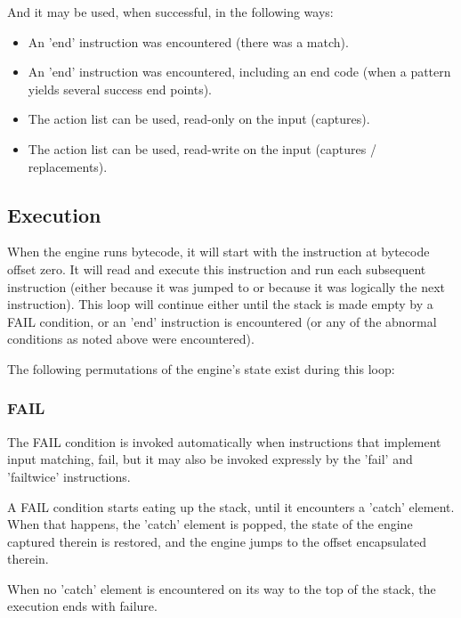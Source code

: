 And it may be used, when successful, in the following ways:

\begin{itemize}

\item An 'end' instruction was encountered (there was a match).

\item An 'end' instruction was encountered, including an end code
(when a pattern yields several success end points).

\item The action list can be used, read-only on the input (captures).

\item The action list can be used, read-write on the input
(captures / replacements).

\end{itemize}

\subsection{Execution}

When the engine runs bytecode, it will start with the instruction
at bytecode offset zero. It will read and execute this instruction
and run each subsequent instruction (either because it was jumped to
or because it was logically the next instruction).
This loop will continue either until the stack is made empty by a FAIL
condition, or an 'end' instruction is encountered
(or any of the abnormal conditions as noted above were encountered).

The following permutations of the engine's state exist during this loop:

\subsubsection{FAIL}

The FAIL condition is invoked automatically when instructions
that implement input matching, fail, but it may also be invoked
expressly by the 'fail' and 'failtwice' instructions.

A FAIL condition starts eating up the stack, until it encounters
a 'catch' element. When that happens, the 'catch' element is popped,
the state of the engine captured therein is restored, and the engine
jumps to the offset encapsulated therein.

When no 'catch' element is encountered on its way to the top of the stack,
the execution ends with failure.

